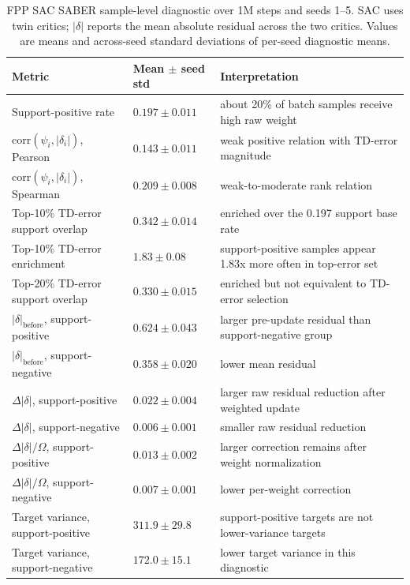 \documentclass[letterpaper]{article}
\begin{document}
\begin{table}[t]
\centering
\small
\caption{FPP SAC SABER sample-level diagnostic over 1M steps and seeds 1--5. SAC uses twin critics; \(|\delta|\) reports the mean absolute residual across the two critics. Values are means and across-seed standard deviations of per-seed diagnostic means.}
\label{tab:fpp-sac-diagnostic}
\begin{tabular}{p{}p{}p{}}
\toprule
Metric & Mean \(\pm\) seed std & Interpretation \\
\midrule
Support-positive rate & \(0.197 \pm 0.011\) & about 20\% of batch samples receive high raw weight \\
\(\mathrm{corr}(\psi_i,|\delta_i|)\), Pearson & \(0.143 \pm 0.011\) & weak positive relation with TD-error magnitude \\
\(\mathrm{corr}(\psi_i,|\delta_i|)\), Spearman & \(0.209 \pm 0.008\) & weak-to-moderate rank relation \\
Top-10\% TD-error support overlap & \(0.342 \pm 0.014\) & enriched over the 0.197 support base rate \\
Top-10\% TD-error enrichment & \(1.83 \pm 0.08\) & support-positive samples appear 1.83x more often in top-error set \\
Top-20\% TD-error support overlap & \(0.330 \pm 0.015\) & enriched but not equivalent to TD-error selection \\
\(|\delta|_{\mathrm{before}}\), support-positive & \(0.624 \pm 0.043\) & larger pre-update residual than support-negative group \\
\(|\delta|_{\mathrm{before}}\), support-negative & \(0.358 \pm 0.020\) & lower mean residual \\
\(\Delta|\delta|\), support-positive & \(0.022 \pm 0.004\) & larger raw residual reduction after weighted update \\
\(\Delta|\delta|\), support-negative & \(0.006 \pm 0.001\) & smaller raw residual reduction \\
\(\Delta|\delta|/\Omega\), support-positive & \(0.013 \pm 0.002\) & larger correction remains after weight normalization \\
\(\Delta|\delta|/\Omega\), support-negative & \(0.007 \pm 0.001\) & lower per-weight correction \\
Target variance, support-positive & \(311.9 \pm 29.8\) & support-positive targets are not lower-variance targets \\
Target variance, support-negative & \(172.0 \pm 15.1\) & lower target variance in this diagnostic \\
\bottomrule
\end{tabular}
\end{table}
\end{document}

